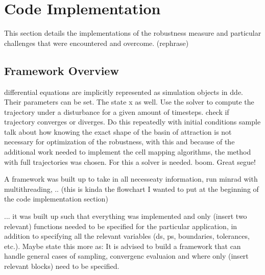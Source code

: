 


    


\section{Code Implementation}

This section details the implementations of the robustness measure and particular challenges that were encountered and overcome. (rephrase)

\subsection{Framework Overview}

differential equations are implicitly represented as simulation objects in dde. Their parameters can be set. The state x as well. Use the solver to compute the trajectory under a disturbance for a given amount of timesteps. check if trajectory converges or diverges. Do this repeatedly with initial conditions sample
talk about how knowing the exact shape of the basin of attraction is not necessary for optimization of the robustness, with this and because of the additional work needed to implement the cell mapping algorithms, the method with full trajectories was chosen. For this a solver is needed. boom. Great segue!

A framework was built up to take in all necesseaty information, run minrad with multithreading, ..
    (this is kinda the flowchart I wanted to put at the beginning of the code implementation section)


... it was built up such that everything was implemented and only (insert two relevant) functions needed to be specified for the particular application, in addition to specifying all the relevant variables (ds, ps, boundaries, tolerances, etc.).
    Maybe state this more as: It is advised to build a framework that can handle general cases of sampling, convergenc evaluaion and where only (insert relevant blocks) need to be specified. 

